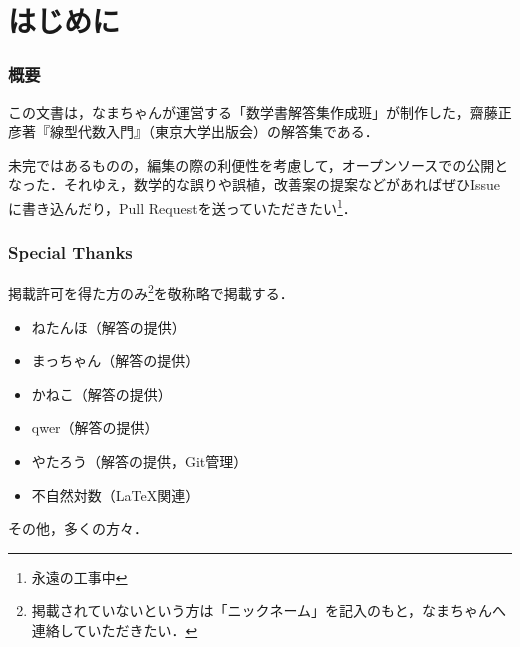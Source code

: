 \documentclass[a4paper,10pt,fleqn]{ltjsarticle}
\begin{document}


\thispagestyle{empty}

\newpage
{}
\pagecolor{white}

\begin{multicols}{3}
  \tableofcontents
\end{multicols}

\newpage

\part*{はじめに}

\section*{概要}

この文書は，なまちゃんが運営する「数学書解答集作成班」が制作した，齋藤正彦著『線型代数入門』（東京大学出版会）の解答集である．

未完ではあるものの，編集の際の利便性を考慮して，オープンソースでの公開となった．それゆえ，数学的な誤りや誤植，改善案の提案などがあればぜひIssueに書き込んだり，Pull Requestを送っていただきたい\footnote{永遠の工事中}．


\section*{Special Thanks}

掲載許可を得た方のみ\footnote{掲載されていないという方は「ニックネーム」を記入のもと，なまちゃんへ連絡していただきたい．}を敬称略で掲載する．
\begin{itemize}
  \item ねたんほ（解答の提供）
  \item まっちゃん（解答の提供）
  \item かねこ（解答の提供）
  \item qwer（解答の提供）
  \item やたろう（解答の提供，Git管理）
  \item 不自然対数（\LaTeX 関連）
\end{itemize}

その他，多くの方々．
\end{document}
